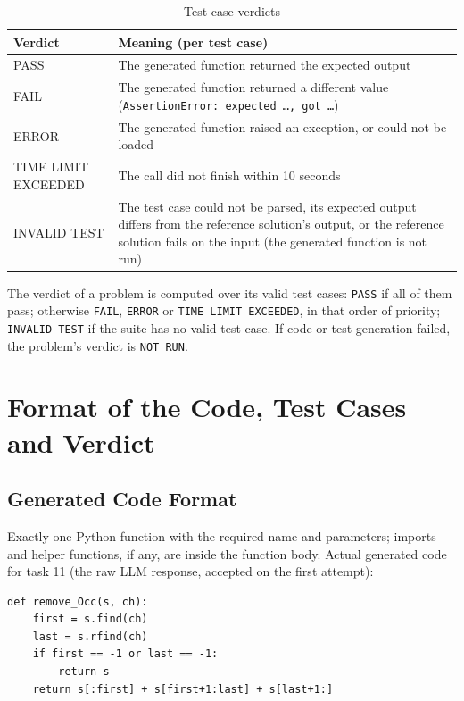 \documentclass[12pt, a4paper]{article}
\begin{document}
\begin{table}[H]
    \centering
    \begin{tabular}{lp{10cm}}
        \toprule
        \textbf{Verdict} & \textbf{Meaning (per test case)} \\
        \midrule
        PASS & The generated function returned the expected output \\
        FAIL & The generated function returned a different value (\texttt{AssertionError: expected \ldots, got \ldots}) \\
        ERROR & The generated function raised an exception, or could not be loaded \\
        TIME LIMIT EXCEEDED & The call did not finish within 10 seconds \\
        INVALID TEST & The test case could not be parsed, its expected output differs from the reference solution's output, or the reference solution fails on the input (the generated function is not run) \\
        \bottomrule
    \end{tabular}
    \caption{Test case verdicts}
\end{table}

The verdict of a problem is computed over its valid test cases: \texttt{PASS} if all of them pass; otherwise \texttt{FAIL}, \texttt{ERROR} or \texttt{TIME LIMIT EXCEEDED}, in that order of priority; \texttt{INVALID TEST} if the suite has no valid test case. If code or test generation failed, the problem's verdict is \texttt{NOT RUN}.

\section{Format of the Code, Test Cases and Verdict}

\subsection{Generated Code Format}
\label{sec:codeformat}

Exactly one Python function with the required name and parameters; imports and helper functions, if any, are inside the function body. Actual generated code for task 11 (the raw LLM response, accepted on the first attempt):

\begin{lstlisting}[caption={Generated code, task 11}]
def remove_Occ(s, ch):
    first = s.find(ch)
    last = s.rfind(ch)
    if first == -1 or last == -1:
        return s
    return s[:first] + s[first+1:last] + s[last+1:]
\end{lstlisting}
\end{document}
